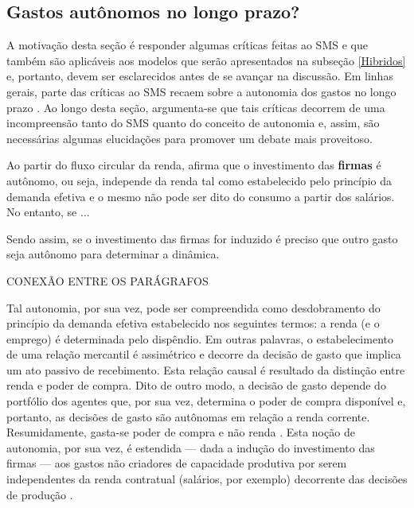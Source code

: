 \subsection{Gastos autônomos no longo prazo?}
\label{CrescimentoAutonomo}

A motivação desta seção é responder algumas críticas feitas ao SMS e que também são aplicáveis aos modelos que serão apresentados na subseção \ref{Hibridos} e, portanto, devem ser esclarecidos antes de se avançar na discussão.
Em linhas gerais, parte das críticas ao SMS recaem sobre a autonomia dos gastos no longo prazo \cites{skott_autonomous_2017}{nikiforos_comments_2018}. 
Ao longo desta seção, argumenta-se que tais críticas decorrem de uma incompreensão tanto do SMS quanto do conceito de autonomia e, assim, são necessárias algumas elucidações para promover um debate mais proveitoso.


Ao partir do fluxo circular da renda, \textcite{serrano_long_1995} afirma que o investimento das \textbf{firmas} é autônomo, ou seja, independe da renda tal como estabelecido pelo princípio da demanda efetiva e o mesmo não pode ser dito do consumo a partir dos salários.
No entanto, se ...
 
Sendo assim, se  o investimento das firmas for induzido é preciso que outro gasto seja autônomo para determinar a dinâmica.

CONEXÃO ENTRE OS PARÁGRAFOS

Tal autonomia, por sua vez, pode ser compreendida como desdobramento do princípio da demanda efetiva estabelecido nos seguintes termos: a renda (e o emprego) é determinada pelo dispêndio. Em outras palavras, o estabelecimento de uma relação mercantil é assimétrico e decorre da decisão de gasto que implica um ato passivo de recebimento. 
Esta relação causal é resultado da distinção entre renda e poder de compra. Dito de outro modo, a decisão de gasto depende do portfólio dos agentes que, por sua vez, determina o poder de compra disponível e, portanto, as decisões de gasto são autônomas em relação a renda corrente.
Resumidamente, gasta-se poder de compra e não renda  \cites{possas_demanda_1981}[p.~47--72]{possas_dinamica_1987}[p.~1--9]{macedo_e_silva_macroeconomia_1999}.
Esta noção de autonomia, por sua vez, é estendida --- dada a indução do investimento das firmas --- aos gastos não criadores de capacidade produtiva por serem independentes da renda contratual (salários, por exemplo) decorrente das decisões de produção \cite{serrano_sraffian_1995}.



